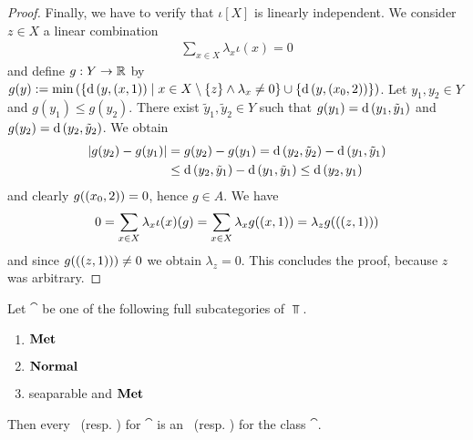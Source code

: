 \begin{proof}
	
	Finally, we have to verify that $\iota[X]$ is linearly independent. We consider $z \in X$ a linear combination 
	\begin{align*}
		\sum_{x \in X} \lambda_x \iota(x) = 0
	\end{align*}
	and define $g: Y \to \mathbb R$ by $g(y) := \min{\left ( {\left \{ \operatorname{d}{\left ( y, (x, 1) \right )} \mid x \in X \setminus \{z\} \land \lambda_x \neq 0 \right \}} \cup {\left \{ \operatorname{d}{\left ( y, {\left ( x_0, 2 \right )} \right )} \right \}} \right )}$. Let $y_1, y_2 \in Y$ and \Wlog $g(y_1) \leq g(y_2)$. There exist $\tilde{y}_1, \tilde{y}_2 \in Y$ such that $g(y_1) = \operatorname{d}{\left ( y_1, \tilde{y}_1 \right )}$ and $g(y_2) = \operatorname{d}{\left ( y_2, \tilde{y}_2 \right )}$. We obtain
	\begin{align*}
		{\left | g(y_2) - g(y_1) \right |} &= g(y_2) - g(y_1) = \operatorname{d}{\left ( y_2, \tilde{y}_2 \right )} - \operatorname{d}{\left ( y_1, \tilde{y}_1 \right )} \\
		&\leq \operatorname{d}{\left ( y_2, \tilde{y}_1 \right )} - \operatorname{d}{\left ( y_1, \tilde{y}_1 \right )} \leq \operatorname{d}{\left ( y_2, y_1 \right )}
	\end{align*}
	and clearly $g{\left ( {\left ( x_0, 2 \right )} \right )} = 0$, hence $g \in A$. We have
	\begin{align*}
		0 = \sum_{x \in X} \lambda_x \iota(x)(g) = \sum_{x \in X} \lambda_x g{\left ( {\left ( x, 1 \right )} \right )} = \lambda_z g({\left ( {\left ( z, 1 \right )} \right )})
	\end{align*}
	and since $g({\left ( {\left ( z, 1 \right )} \right )}) \neq 0$ we obtain $\lambda_z = 0$. This concludes the proof, because $z$ was arbitrary.  
\end{proof}

\begin{theorem}\cite[p. 84]{ToR} \label{theorem:anr_to_ane}
	Let $\cat$ be one of the following full subcategories of $\Top$.
	\begin{enumerate}
		\item $\mathbf{Met}$
		\item $\mathbf{Normal}$
		\item seaparable and $\mathbf{Met}$
	\end{enumerate}
	Then every \anr\ (resp. \ar) for $\cat$ is an \ane\ (resp. \aex) for the class $\cat$. 
\end{theorem}